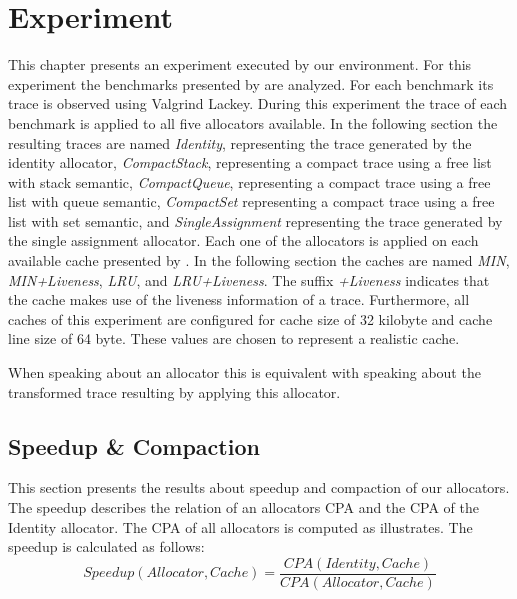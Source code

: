 \documentclass[onecolumn, openright, master, english, signatures]{dbrgrptt}
\begin{document}
\chapter{Experiment}\label{cha:experiment}

This chapter presents an experiment executed by our environment. For this experiment the benchmarks presented by  are analyzed. For each benchmark its \ac{trace} is observed using Valgrind Lackey. During this experiment the \ac{trace} of each benchmark is applied to all five allocators available. In the following section the resulting \ac{trace}s are named \emph{Identity}, representing the \ac{trace} generated by the identity allocator, \emph{CompactStack}, representing a compact \ac{trace} using a free list with stack semantic, \emph{CompactQueue}, representing a compact \ac{trace} using a free list with queue semantic, \emph{CompactSet} representing a compact \ac{trace} using a free list with set semantic, and \emph{SingleAssignment} representing the \ac{trace} generated by the single assignment allocator. Each one of the allocators is applied on each available cache presented by . In the following section the caches are named \emph{\ac{MIN}}, \emph{\ac{MIN}+Liveness}, \emph{\ac{LRU}}, and \emph{\ac{LRU}+Liveness}. The suffix \emph{+Liveness} indicates that the cache makes use of the liveness information of a \ac{trace}. Furthermore, all caches of this experiment are configured for cache size of 32 kilobyte and cache line size of 64 byte. These values are chosen to represent a realistic cache.

\begin{remark}
When speaking about an allocator this is equivalent with speaking about the transformed \ac{trace} resulting by applying this allocator.
\end{remark}

\section{Speedup \& Compaction}
\label{sec:exp-speedup-compaction}

This section presents the results about speedup and compaction of our allocators. The speedup describes the relation of an allocators \ac{CPA} and the \ac{CPA} of the Identity allocator. The \ac{CPA} of all allocators is computed as  illustrates. The speedup is calculated as follows:
$$Speedup(Allocator, Cache) = \frac{CPA(Identity, Cache)}{CPA(Allocator, Cache)}$$
\end{document}
